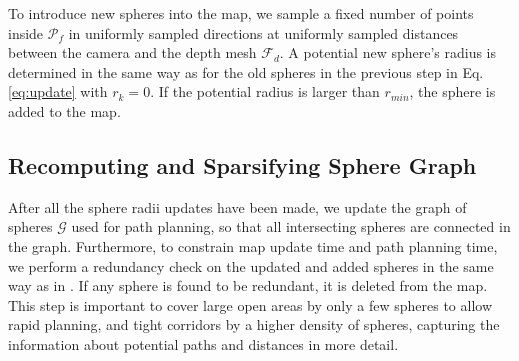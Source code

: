\documentclass[letterpaper, 10 pt, journal, twoside]{IEEEtran}
\begin{document}
{To introduce new spheres into the map, we sample a fixed number of points inside $\mathcal{P}_f$ in uniformly sampled directions at uniformly sampled distances between the camera and the depth mesh $\mathcal{F}_d$.}
A potential new sphere's radius is determined in the same way as for the old spheres in the previous step in Eq. \ref{eq:update} with $r_k = 0$.
If the potential radius is larger than $r_{min}$, the sphere is added to the map.

\subsection{Recomputing and Sparsifying Sphere Graph}
\label{sec:graph_update}
After all the sphere radii updates have been made, we update the graph of spheres $\mathcal{G}$ used for path planning, so that all intersecting spheres are connected in the graph.
Furthermore, to constrain map update time and path planning time, we perform a redundancy check on the updated and added spheres in the same way as in \cite{spheremap}.
If any sphere is found to be redundant, it is deleted from the map.
This step is important to cover large open areas by only a few spheres to allow rapid planning, and tight corridors by a higher density of spheres, capturing the information about potential paths and distances in more detail.
\end{document}
